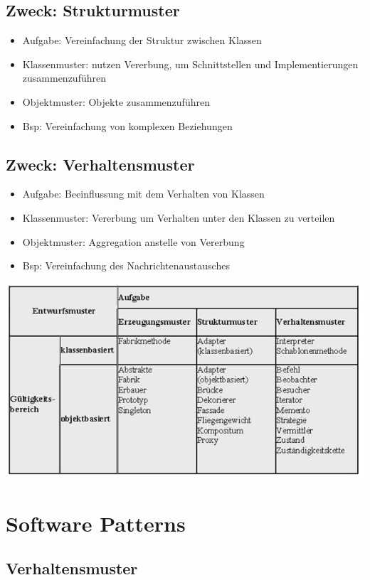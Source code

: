 \documentclass[11pt, fleqn, a4paper, leqno]{scrartcl} %
\begin{document}
		\subsection{Zweck: Strukturmuster}
			\begin{itemize}
				\item Aufgabe: Vereinfachung der Struktur zwischen Klassen
				\item Klassenmuster: nutzen Vererbung, um Schnittstellen und Implementierungen zusammenzuführen
				\item Objektmuster: Objekte zusammenzuführen
				\item Bsp: Vereinfachung von komplexen Beziehungen		
			\end{itemize}
		\subsection{Zweck: Verhaltensmuster}
			\begin{itemize}
				\item Aufgabe: Beeinflussung mit dem Verhalten von Klassen
				\item Klassenmuster: Vererbung um Verhalten unter den Klassen zu verteilen
				\item Objektmuster: Aggregation anstelle von Vererbung
				\item Bsp: Vereinfachung des Nachrichtenaustausches
			\end{itemize}
		\includegraphics[scale=0.7]{images/overview.jpg}
	\newpage
	\section{Software Patterns}
		\subsection{Verhaltensmuster}
\end{document}
